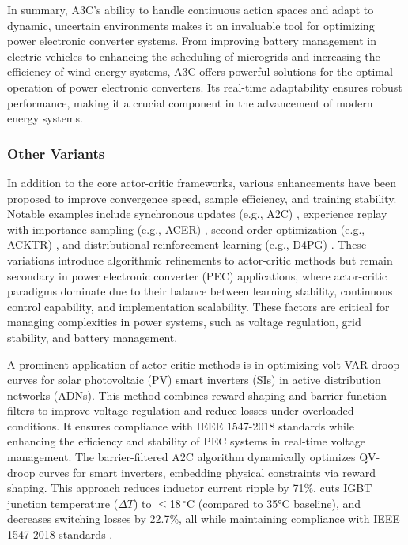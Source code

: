 In summary, A3C's ability to handle continuous action spaces and adapt to dynamic, uncertain environments makes it an invaluable tool for optimizing power electronic converter systems. From improving battery management in electric vehicles to enhancing the scheduling of microgrids and increasing the efficiency of wind energy systems, A3C offers powerful solutions for the optimal operation of power electronic converters. Its real-time adaptability ensures robust performance, making it a crucial component in the advancement of modern energy systems.

\subsubsection{Other Variants}

In addition to the core actor-critic frameworks, various enhancements have been proposed to improve convergence speed, sample efficiency, and training stability. Notable examples include synchronous updates (e.g., A2C) \cite{mnih2016asynchronous}, experience replay with importance sampling (e.g., ACER) \cite{wang2016sample}, second-order optimization (e.g., ACKTR) \cite{wu2017scalable}, and distributional reinforcement learning (e.g., D4PG) \cite{bellemare2017distributional}. These variations introduce algorithmic refinements to actor-critic methods but remain secondary in power electronic converter (PEC) applications, where actor-critic paradigms dominate due to their balance between learning stability, continuous control capability, and implementation scalability. These factors are critical for managing complexities in power systems, such as voltage regulation, grid stability, and battery management.

A prominent application of actor-critic methods is in optimizing volt-VAR droop curves for solar photovoltaic (PV) smart inverters (SIs) in active distribution networks (ADNs). This method combines reward shaping and barrier function filters to improve voltage regulation and reduce losses under overloaded conditions. It ensures compliance with IEEE 1547-2018 standards while enhancing the efficiency and stability of PEC systems in real-time voltage management. The barrier-filtered A2C algorithm dynamically optimizes QV-droop curves for smart inverters, embedding physical constraints via reward shaping. This approach reduces inductor current ripple by 71\%, cuts IGBT junction temperature ($\Delta T$) to $\leq$18\,$^\circ$C (compared to 35°C baseline), and decreases switching losses by 22.7\%, all while maintaining compliance with IEEE 1547-2018 standards \cite{glover2024learning}.

